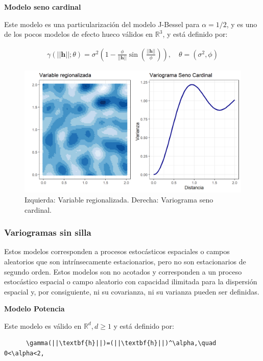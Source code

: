 \documentclass[
]{book}
\begin{document}
\textbf{Modelo seno cardinal}

Este modelo es una particularización del modelo J-Bessel para \(\alpha=1/2\), y es uno de los pocos modelos de efecto hueco válidos en \(\mathbb{R}^3\), y está definido por:

\begin{align}
    \gamma(||\textbf{h}||;\theta)=\sigma^2 \left(1-\frac{\phi}{||\textbf{h}||}\sin\left(\frac{||\textbf{h}||}{\phi} \right)  \right),\quad \theta=(\sigma^2,\phi)
\end{align}

\begin{figure}
\includegraphics[width=17.78in]{figuras/otros/sin_var} \caption{Izquierda: Variable regionalizada. Derecha: Variograma seno cardinal.}\label{fig:sinvar}
\end{figure}

\hypertarget{variogramas-sin-silla}{%
\subsubsection*{Variogramas sin silla}\label{variogramas-sin-silla}}

Estos modelos corresponden a procesos estocásticos espaciales o campos aleatorios que son intrínsecamente estacionarios, pero no son estacionarios de segundo orden. Estos modelos son no acotados y corresponden a un proceso estocástico espacial o campo aleatorio con capacidad ilimitada para la dispersión espacial y, por consiguiente, ni su covarianza, ni su varianza pueden ser definidas.

\textbf{Modelo Potencia}

Este modelo es válido en \(\mathbb{R}^d,d\geq 1\) y está definido por:

\begin{verbatim}
      \gamma(||\textbf{h}||)=(||\textbf{h}||)^\alpha,\quad  0<\alpha<2, 
\end{verbatim}
\end{document}
